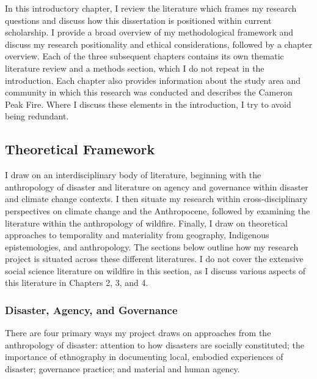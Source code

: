 \documentclass[
]{article}
\begin{document}
In this introductory chapter, I review the literature which frames my research questions and discuss how this dissertation is positioned within current scholarship. I provide a broad overview of my methodological framework and discuss my research positionality and ethical considerations, followed by a chapter overview. Each of the three subsequent chapters contains its own thematic literature review and a methods section, which I do not repeat in the introduction. Each chapter also provides information about the study area and community in which this research was conducted and describes the Cameron Peak Fire. Where I discuss these elements in the introduction, I try to avoid being redundant.

\subsection{Theoretical Framework}\label{theoretical-framework}

I draw on an interdisciplinary body of literature, beginning with the anthropology of disaster and literature on agency and governance within disaster and climate change contexts. I then situate my research within cross-disciplinary perspectives on climate change and the Anthropocene, followed by examining the literature within the anthropology of wildfire. Finally, I draw on theoretical approaches to temporality and materiality from geography, Indigenous epistemologies, and anthropology. The sections below outline how my research project is situated across these different literatures. I do not cover the extensive social science literature on wildfire in this section, as I discuss various aspects of this literature in Chapters 2, 3, and 4.

\subsubsection{Disaster, Agency, and Governance}\label{disaster-agency-and-governance}

There are four primary ways my project draws on approaches from the anthropology of disaster: attention to how disasters are socially constituted; the importance of ethnography in documenting local, embodied experiences of disaster; governance practice; and material and human agency.
\end{document}
